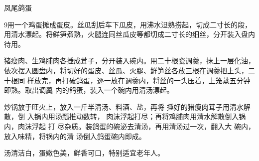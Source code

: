 \begin{recipe}{凤尾鸽蛋}

\ingredients


\preparation

\step 9用一个鸡蛋摊成蛋皮。丝瓜刮后车下瓜皮，用沸水泹熟捞起，切成二寸长的段，
用清水漂起。将鲜笋煮熟，火腿连同丝瓜皮等都切成二寸长的细丝，分开装入盘内待用。

\step 猪瘦肉、生鸡脯肉各捶成茸子，分开装入碗内。用二十根瓷调羹，抹上一层化油，
依次摆入圆盘内，将切好的蛋皮、丝瓜、火腿、鲜笋丝各放三根在调羹把上头，二十根同
样放完，再打破鸽蛋，逐一放在调羹内，将丝的一头压着，上笼蒸五分钟即熟。取出调羹
内的鸽蛋，装入一个碗内用清汤漂起。

炒锅放于旺火上，放入一斤半清汤、料酒、盐，再将 捶好的猪瘦肉茸子用清水解散，倒
入锅内用汤瓢推动数转， 肉沫浮起打尽；再将鸡脯肉用清水解散倒入锅内，肉沫浮起 打
尽杂质。装鸽蛋的碗泌去清汤，再用清汤过一次，翻入大 碗内，放入味精，将锅内的清
汤倒入鸽蛋碗内即成。

\features

汤清洁白，蛋嫩色美，鲜香可口，特别适宜老年人。

\end{recipe}

